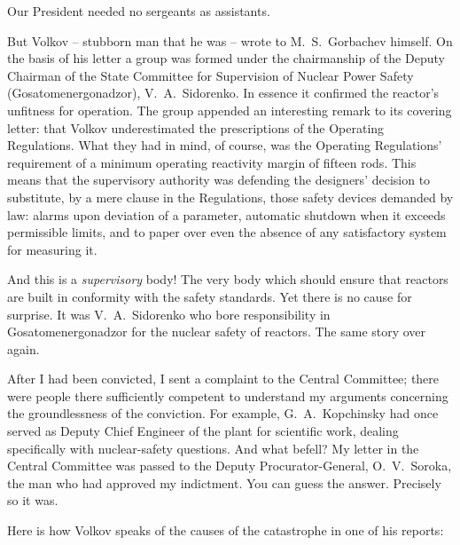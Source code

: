 \documentclass[openright]{bookest}
\begin{document}
Our President needed no sergeants as assistants.

But Volkov -- stubborn man that he was -- wrote to M.~S.~Gorbachev himself. On the basis of his letter a group was formed under the chairmanship of the Deputy Chairman of the State Committee for Supervision of Nuclear Power Safety (Gosatomenergonadzor), V.~A.~Sidorenko. In essence it confirmed the reactor's unfitness for operation. The group appended an interesting remark to its covering letter: that Volkov underestimated the prescriptions of the Operating Regulations. What they had in mind, of course, was the Operating Regulations' requirement of a minimum operating reactivity margin of fifteen rods. This means that the supervisory authority was defending the designers' decision to substitute, by a mere clause in the Regulations, those safety devices demanded by law: alarms upon deviation of a parameter, automatic shutdown when it exceeds permissible limits, and to paper over even the absence of any satisfactory system for measuring it.

And this is a \textit{supervisory} body! The very body which should ensure that reactors are built in conformity with the safety standards. Yet there is no cause for surprise. It was V.~A.~Sidorenko who bore responsibility in Gosatomenergonadzor for the nuclear safety of reactors. The same story over again.

After I had been convicted, I sent a complaint to the Central Committee; there were people there sufficiently competent to understand my arguments concerning the groundlessness of the conviction. For example, G.~A.~Kopchinsky had once served as Deputy Chief Engineer of the plant for scientific work, dealing specifically with nuclear-safety questions. And what befell? My letter in the Central Committee was passed to the Deputy Procurator-General, O.~V.~Soroka, the man who had approved my indictment. You can guess the answer. Precisely so it was.

Here is how Volkov speaks of the causes of the catastrophe in one of his reports:
\end{document}
